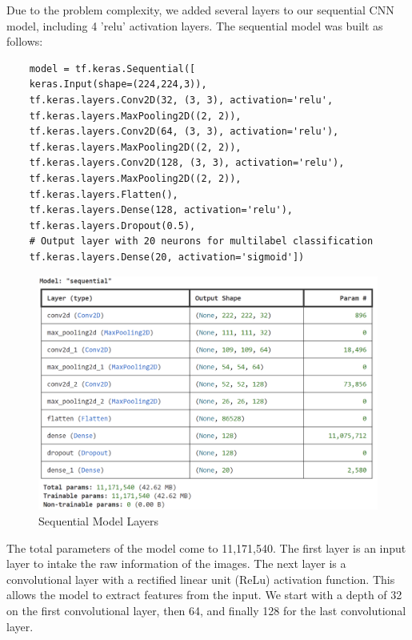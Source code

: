 \documentclass{article}
\begin{document}
Due to the problem complexity, we added several layers to our sequential CNN model, including 4 'relu' activation layers. The sequential model was built as follows:
\begin{verbatim}
    model = tf.keras.Sequential([
    keras.Input(shape=(224,224,3)),
    tf.keras.layers.Conv2D(32, (3, 3), activation='relu',
    tf.keras.layers.MaxPooling2D((2, 2)),
    tf.keras.layers.Conv2D(64, (3, 3), activation='relu'),
    tf.keras.layers.MaxPooling2D((2, 2)),
    tf.keras.layers.Conv2D(128, (3, 3), activation='relu'),
    tf.keras.layers.MaxPooling2D((2, 2)),
    tf.keras.layers.Flatten(),
    tf.keras.layers.Dense(128, activation='relu'),
    tf.keras.layers.Dropout(0.5),
    # Output layer with 20 neurons for multilabel classification
    tf.keras.layers.Dense(20, activation='sigmoid'])  
\end{verbatim}

\begin{figure}[h!]
    \centering
    \includegraphics[width=0.8\linewidth]{Screenshot 2024-05-25 230030.png}
    \caption{Sequential Model Layers}
    \label{fig:enter-label}
\end{figure}

The total parameters of the model come to 11,171,540. The first layer is an input layer to intake the raw information of the images. The next layer is a convolutional layer with a rectified linear unit (ReLu) activation function. This allows the model to extract features from the input. We start with a depth of 32 on the first convolutional layer, then 64, and finally 128 for the last convolutional layer. \\
\end{document}
